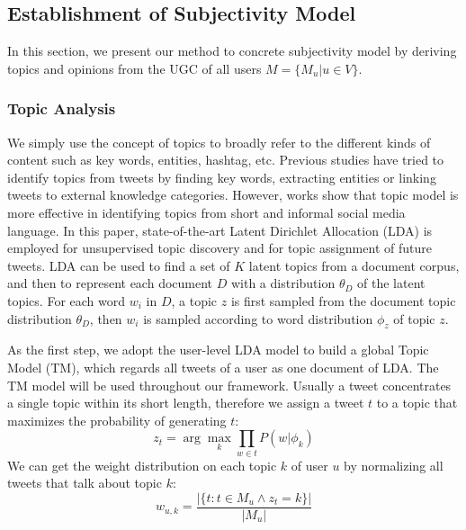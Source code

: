 \documentclass[letterpaper]{article}
\begin{document}
 
\subsection{Establishment of Subjectivity Model}
\label{establishment}

In this section, we present our method to concrete subjectivity model by deriving topics and opinions from the UGC of all users $ M=\lbrace M_{u}\vert u \in V\rbrace$.

\subsubsection{Topic Analysis}
\label{topic}

We simply use the concept of topics to broadly refer to the different kinds of content such as key words, entities, hashtag, etc. Previous studies have tried to identify topics from tweets by finding key words\cite{chen2010short}, extracting  entities\cite{abel2011analyzing} or linking tweets to external knowledge categories\cite{macskassy2011people}. However, works show that topic model is more effective in identifying topics from short and informal social media language\cite{hong2010empirical}. In this paper, state-of-the-art Latent Dirichlet Allocation (LDA)\cite{blei2003latent} is employed for unsupervised topic discovery and for topic assignment of future tweets. LDA can be used to find a set of $ K $ latent topics from a document corpus, and then to represent each document $ D $ with a distribution $ \theta_{D} $ of the latent topics. For each word $ w_{i} $ in $ D $, a topic $ z $ is first sampled from the document topic distribution $ \theta_{D} $, then $ w_{i} $ is sampled according to word distribution $ \phi_{z} $ of topic $ z $. 

As the first step, we adopt the user-level LDA model to build a global Topic Model (TM), which regards all tweets of a user as one document of LDA\cite{hong2010empirical}. The TM model will be used throughout our framework. 
Usually a tweet concentrates a single topic within its short length, therefore we assign a tweet $ t $ to a topic that maximizes the probability of generating $ t $:
\begin{equation}
\label{twtopic}
z_{t} = \arg \max_{k}\prod_{w \in t} P(w|\phi_{k})
\end{equation}
We can get the weight distribution on each topic $ k $ of user $ u $ by normalizing all tweets that talk about topic $ k $: 
\begin{equation}
w_{u,k}=\dfrac{|\{ t: t \in M_{u} \wedge z_{t}=k\}|}{|M_{u}|}
\end{equation}
\end{document}
